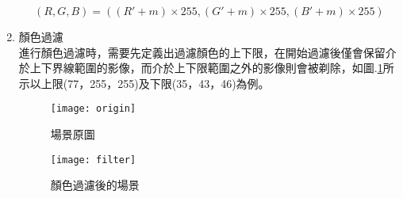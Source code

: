 \begin{enumerate}
$$(R,G,B)=(({R}'+m)\times 255,({G}'+m)\times 255,({B}'+m)\times 255)$$

\item 顏色過濾\\
進行顏色過濾時，需要先定義出過濾顏色的上下限，在開始過濾後僅會保留介於上下界線範圍的影像，而介於上下限範圍之外的影像則會被剃除，如圖.\ref{filter}所示以上限(77，255，255)及下限(35，43，46)為例。\\
\begin{figure}[hbt!]
\center
\begin{minipage}[t]{0.48\textwidth}
\center
\texttt{[image: origin]}
\caption{\Large 場景原圖}
\label{origin}
\end{minipage}
\begin{minipage}[t]{0.48\textwidth}
\center
\texttt{[image: filter]}
\caption{\Large 顏色過濾後的場景}
\label{filter}
\end{minipage}
\end{figure}



\end{enumerate}

\newpage
